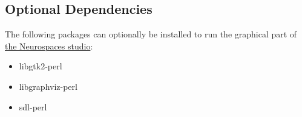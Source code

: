 \documentclass[12pt]{article}
\begin{document}
\subsection*{Optional Dependencies}

The following packages can optionally be installed to run the
graphical part of \href{../studio/studio.tex}{the Neurospaces studio}:
\begin{itemize}
\item libgtk2-perl
\item libgraphviz-perl
\item sdl-perl
\end{itemize}
\end{document}
